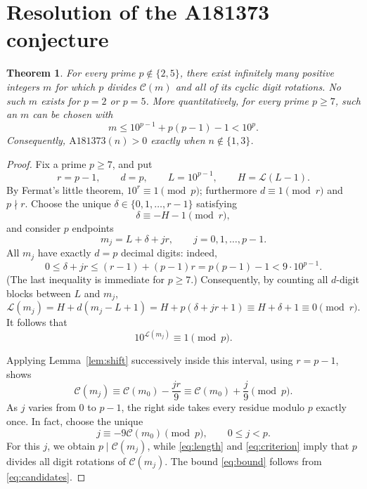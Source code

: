 \documentclass[10pt]{article}
\newtheorem{theorem}{Theorem}
\newcommand{\Cham}{\mathcal{C}}
\newcommand{\len}{\mathcal{L}}
\begin{document}
\section{Resolution of the A181373 conjecture}
\begin{theorem}\label{thm:main}
For every prime $p\notin\{2,5\}$, there exist infinitely many
positive integers $m$ for which $p$ divides $\Cham(m)$ and all of
its cyclic digit rotations. No such $m$ exists for $p=2$ or $p=5$.
More quantitatively, for every prime $p\ge7$, such an $m$ can be chosen
with
\begin{equation}\label{eq:bound}
  m\le10^{p-1}+p(p-1)-1<10^p.
\end{equation}
Consequently, $\mathrm{A181373}(n)>0$ exactly when $n\notin\{1,3\}$.
\end{theorem}
\begin{proof}
Fix a prime $p\ge7$, and put
\[
   r=p-1,\qquad d=p,\qquad L=10^{p-1},\qquad
   H=\len(L-1).
\]
By Fermat's little theorem, $10^r\equiv1\pmod p$;
furthermore $d\equiv1\pmod r$ and $p\nmid r$.
Choose the unique $\delta\in\{0,1,\ldots,r-1\}$ satisfying
\begin{equation}\label{eq:delta}
   \delta\equiv-H-1\pmod r,
\end{equation}
and consider $p$ endpoints
\begin{equation}\label{eq:candidates}
   m_j=L+\delta+jr,\qquad j=0,1,\ldots,p-1.
\end{equation}
All $m_j$ have exactly $d=p$ decimal digits: indeed,
\[
   0\le\delta+jr\le(r-1)+(p-1)r=p(p-1)-1
                         <9\cdot10^{p-1}.
\]
(The last inequality is immediate for $p\ge7$.)
Consequently, by counting all $d$-digit blocks between $L$ and $m_j$,
\[
  \len(m_j)=H+d(m_j-L+1)
            =H+p(\delta+jr+1)\equiv H+\delta+1\equiv0\pmod r.
\]
It follows that
\begin{equation}\label{eq:length}
   10^{\len(m_j)}\equiv1\pmod p.
\end{equation}

Applying Lemma~\ref{lem:shift} successively inside this interval,
using $r=p-1$, shows
\[
   \Cham(m_j)\equiv\Cham(m_0)-\frac{jr}{9}
                  \equiv\Cham(m_0)+\frac{j}{9}\pmod p.
\]
As $j$ varies from $0$ to $p-1$, the right side takes every residue
modulo $p$ exactly once. In fact, choose the unique
\begin{equation}\label{eq:jchoice}
   j\equiv-9\Cham(m_0)\pmod p,\qquad 0\le j<p.
\end{equation}
For this $j$, we obtain $p\mid\Cham(m_j)$, while
\eqref{eq:length} and \eqref{eq:criterion} imply that $p$ divides
all digit rotations of $\Cham(m_j)$. The bound \eqref{eq:bound}
follows from \eqref{eq:candidates}.


\end{proof}
\end{document}
